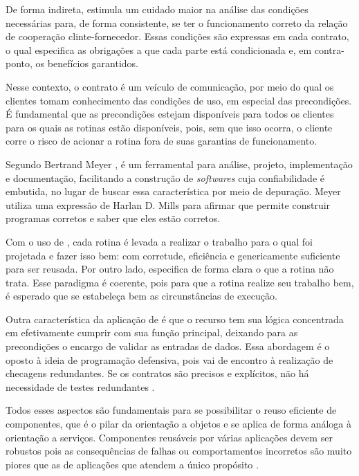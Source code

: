 De forma indireta, \designbycontract{} estimula um cuidado maior na análise das
condições necessárias para, de forma consistente, se ter o funcionamento correto
da relação de cooperação clinte-fornecedor.
Essas condições são expressas em cada contrato, o qual especifica as obrigações
a que cada parte está condicionada e, em contra-ponto, os benefícios garantidos.

Nesse contexto, o contrato é um veículo de comunicação, por meio do qual os
clientes tomam conhecimento das condições de uso, em especial das precondições.
É fundamental que as precondições estejam disponíveis para todos os clientes
para os quais as rotinas estão disponíveis, pois, sem que isso ocorra, o cliente
corre o risco de acionar a rotina fora de suas garantias de funcionamento. 

Segundo Bertrand Meyer \cite{meyer1997object}, \designbycontract{} é um
ferramental para análise, projeto, implementação e documentação, facilitando a
construção de \textit{softwares} cuja confiabilidade é embutida, no lugar de
buscar essa característica por meio de depuração. Meyer utiliza uma expressão de
Harlan D. Mills \cite{mills1975new} para afirmar que \designbycontract{} permite
construir programas corretos e saber que eles estão corretos.

Com o uso de \designbycontract{}, cada rotina é levada a realizar o trabalho
para o qual foi projetada e fazer isso bem: com corretude, eficiência e
genericamente suficiente para ser reusada. Por outro lado, especifica de forma
clara o que a rotina não trata. Esse paradigma é coerente, pois para que a
rotina realize seu trabalho bem, é esperado que se estabeleça bem as
circunstâncias de execução.

Outra característica da aplicação de \designbycontract{} é que o recurso tem sua
lógica concentrada em efetivamente cumprir com sua função principal, deixando
para as precondições o encargo de validar as entradas de dados. Essa abordagem
é o oposto à ideia de programação defensiva, pois vai de encontro à realização
de checagens redundantes. Se os contratos são precisos e explícitos, não há
necessidade de testes redundantes \cite{meyer1992applying}.

Todos esses aspectos são fundamentais para se possibilitar o reuso eficiente de
componentes, que é o pilar da orientação a objetos e se aplica de forma análoga
à orientação a serviços. Componentes reusáveis por várias aplicações devem ser
robustos pois as consequências de falhas ou comportamentos incorretos são muito
piores que as de aplicações que atendem a único propósito
\cite{meyer1992applying}.

